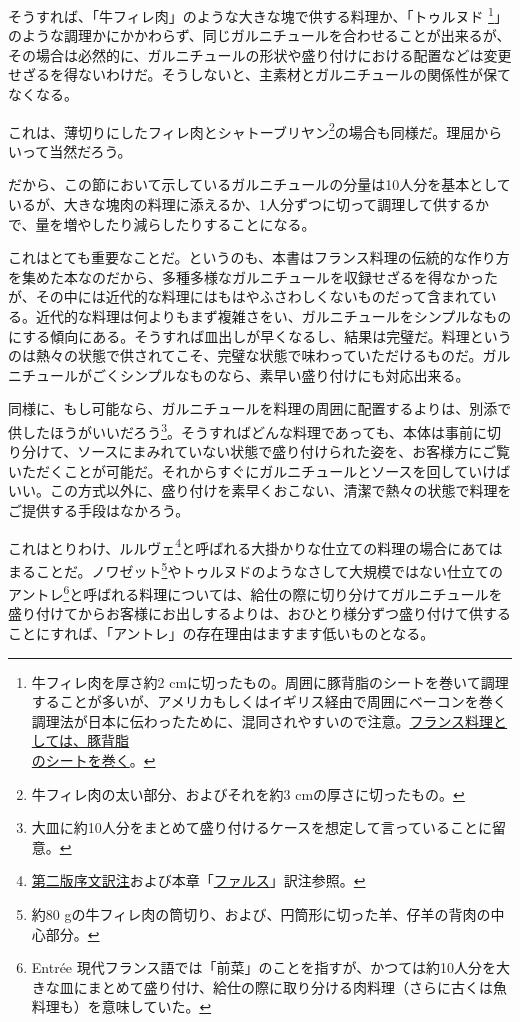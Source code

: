 \begin{Main}
そうすれば、「牛フィレ肉」のような大きな塊で供する料理か、「トゥルヌド
\footnote{牛フィレ肉を厚さ約2
  cmに切ったもの。周囲に豚背脂のシートを巻いて調理することが多いが、アメリカもしくはイギリス経由で周囲にベーコンを巻く調理法が日本に伝わったために、混同されやすいので注意。\ul{フランス料理としては、豚背脂\\のシートを巻く}。}」のような調理かにかかわらず、同じガルニチュールを合わせることが出来るが、その場合は必然的に、ガルニチュールの形状や盛り付けにおける配置などは変更せざるを得ないわけだ。そうしないと、主素材とガルニチュールの関係性が保てなくなる。

これは、薄切りにしたフィレ肉とシャトーブリヤン\footnote{牛フィレ肉の太い部分、およびそれを約3
  cmの厚さに切ったもの。}の場合も同様だ。理屈からいって当然だろう。

だから、この節において示しているガルニチュールの分量は10人分を基本としているが、大きな塊肉の料理に添えるか、1人分ずつに切って調理して供するかで、量を増やしたり減らしたりすることになる。

これはとても重要なことだ。というのも、本書はフランス料理の伝統的な作り方を集めた本なのだから、多種多様なガルニチュールを収録せざるを得なかったが、その中には近代的な料理にはもはやふさわしくないものだって含まれている。近代的な料理は何よりもまず複雑さをい、ガルニチュールをシンプルなものにする傾向にある。そうすれば皿出しが早くなるし、結果は完璧だ。料理というのは熱々の状態で供されてこそ、完璧な状態で味わっていただけるものだ。ガルニチュールがごくシンプルなものなら、素早い盛り付けにも対応出来る。

同様に、もし可能なら、ガルニチュールを料理の周囲に配置するよりは、別添で供したほうがいいだろう\footnote{大皿に約10人分をまとめて盛り付けるケースを想定して言っていることに留意。}。そうすればどんな料理であっても、本体は事前に切り分けて、ソースにまみれていない状態で盛り付けられた姿を、お客様方にご覧いただくことが可能だ。それからすぐにガルニチュールとソースを回していけばいい。この方式以外に、盛り付けを素早くおこない、清潔で熱々の状態で料理をご提供する手段はなかろう。

これはとりわけ、ルルヴェ\footnote{\protect\hyperlink{releve}{第二版序文訳注}および本章「\protect\hyperlink{farces}{ファルス}」訳注参照。}と呼ばれる大掛かりな仕立ての料理の場合にあてはまることだ。ノワゼット\footnote{約80
  gの牛フィレ肉の筒切り、および、円筒形に切った羊、仔羊の背肉の中心部分。}やトゥルヌドのようなさして大規模ではない仕立てのアントレ\footnote{Entrée
  現代フランス語では「前菜」のことを指すが、かつては約10人分を大きな皿にまとめて盛り付け、給仕の際に取り分ける肉料理（さらに古くは魚料理も）を意味していた。}と呼ばれる料理については、給仕の際に切り分けてガルニチュールを盛り付けてからお客様にお出しするよりは、おひとり様分ずつ盛り付けて供することにすれば、「アントレ」の存在理由はますます低いものとなる。


\end{Main}
